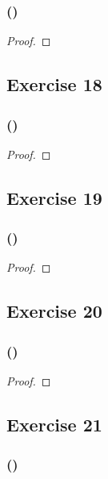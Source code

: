 \documentclass[14pt]{extarticle}
\begin{document}
\subsubsection{()}

\begin{proof}

\end{proof}

\subsection{Exercise 18}

\subsubsection{()}

\begin{proof}

\end{proof}

\subsection{Exercise 19}

\subsubsection{()}

\begin{proof}

\end{proof}

\subsection{Exercise 20}

\subsubsection{()}

\begin{proof}

\end{proof}

\subsection{Exercise 21}

\subsubsection{()}
\end{document}

